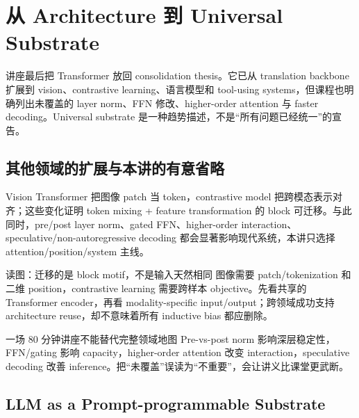 \section{从 Architecture 到 Universal Substrate}

讲座最后把 Transformer 放回 consolidation thesis。它已从 translation backbone 扩展到 vision、contrastive learning、语言模型和 tool-using systems，但课程也明确列出未覆盖的 layer norm、FFN 修改、higher-order attention 与 faster decoding。Universal substrate 是一种趋势描述，不是“所有问题已经统一”的宣告。

\subsection{其他领域的扩展与本讲的有意省略}

Vision Transformer 把图像 patch 当 token，contrastive model 把跨模态表示对齐；这些变化证明 token mixing + feature transformation 的 block 可迁移。与此同时，pre/post layer norm、gated FFN、higher-order interaction、speculative/non-autoregressive decoding 都会显著影响现代系统，本讲只选择 attention/position/system 主线。


\begin{knowledgebox}{读图：迁移的是 block motif，不是输入天然相同}
图像需要 patch/tokenization 和二维 position，contrastive learning 需要跨样本 objective。先看共享的 Transformer encoder，再看 modality-specific input/output；跨领域成功支持 architecture reuse，却不意味着所有 inductive bias 都应删除。
\end{knowledgebox}


\begin{warningbox}{一场 80 分钟讲座不能替代完整领域地图}
Pre-vs-post norm 影响深层稳定性，FFN/gating 影响 capacity，higher-order attention 改变 interaction，speculative decoding 改善 inference。把“未覆盖”误读为“不重要”，会让讲义比课堂更武断。
\end{warningbox}


\subsection{LLM as a Prompt-programmable Substrate}


